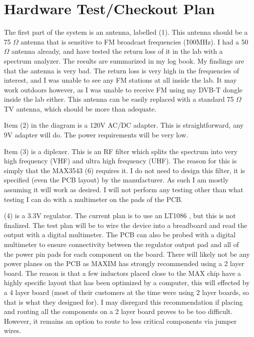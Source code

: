 \documentclass[a4paper, 12pt]{article}
\begin{document}
\section{Hardware Test/Checkout Plan}
The first part of the system is an antenna, labelled (1).  This antenna should be a 75 $\Omega$ antenna that is sensitive to FM broadcast frequencies (\~100MHz).  I had a 50 $\Omega$ antenna already, and have tested the return loss of it in the lab with a spectrum analyzer.  The results are summarized in my log book.  My findings are that the antenna is very bad.  The return loss is very high in the frequencies of interest, and I was unable to see any FM stations at all inside the lab.  It may work outdoors however, as I was unable to receive FM using my DVB-T dongle inside the lab either.  This antenna can be easily replaced with a standard 75 $\Omega$ TV antenna, which should be more than adequate.

Item (2) in the diagram is a 120V AC/DC adapter.  This is straightforward, any 9V adapter will do.  The power requirements will be very low.

Item (3) is a diplexer.  This is an RF filter which splits the spectrum into very high frequency (VHF) and ultra high frequency (UHF).  The reason for this is simply that the MAX3543 (6) requires it.  I do not need to design this filter, it is specified (even the PCB layout) by the manufacturer.  As such I am mostly assuming it will work as desired.  I will not perform any testing other than what testing I can do with a multimeter on the pads of the PCB.

(4) is a 3.3V regulator.  The current plan is to use an LT1086 \cite{lt1086}, but this is not finalized.  The test plan will be to wire the device into a breadboard and read the output with a digital multimeter.  The PCB can also be probed with a digital multimeter to ensure connectivity between the regulator output pad and all of the power pin pads for each component on the board.  There will likely not be any power planes on the PCB as MAXIM has strongly recommended using a 2 layer board.  The reason is that a few inductors placed close to the MAX chip have a highly specific layout that has been optimized by a computer, this will effected by a 4 layer board (most of their customers at the time were using 2 layer boards, so that is what they designed for).  I may disregard this recommendation if placing and routing all the components on a 2 layer board proves to be too difficult.  However, it remains an option to route to less critical components via jumper wires.
\end{document}
